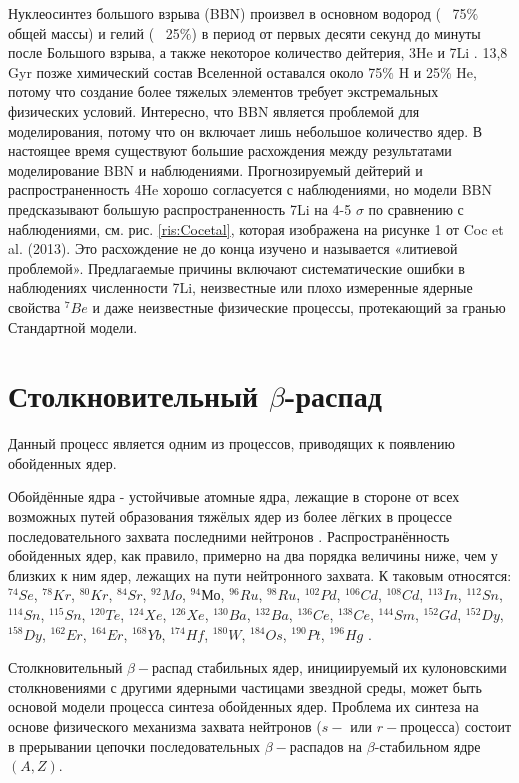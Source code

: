 \documentclass[%
master,    %
natbib,      %
subf,        %
href,        %
colorlinks,  %
]{disser}
\begin{document}
Нуклеосинтез большого взрыва (BBN) произвел в основном водород (~ 75$\%$ общей массы) и гелий (~ 25$\%$) в период от первых десяти секунд до минуты после Большого взрыва, а также некоторое количество дейтерия, 3He и 7Li \cite{Tytler}. 13,8 Gyr позже химический состав Вселенной оставался около 75$\%$ H и 25$\%$ He, потому что создание более тяжелых элементов требует экстремальных физических условий. Интересно, что BBN является проблемой для моделирования, потому что он включает лишь небольшое количество ядер. В настоящее время существуют большие расхождения между результатами моделирование BBN и наблюдениями. Прогнозируемый дейтерий и распространенность 4He хорошо согласуется с наблюдениями, но модели BBN предсказывают большую распространенность 7Li на 4-5 $\sigma$ по сравнению с наблюдениями, см. рис. \ref{ris:Cocetal}, которая изображена на рисунке 1 от Coc et al. (2013). Это расхождение не до конца изучено и называется «литиевой проблемой». Предлагаемые причины включают систематические ошибки в наблюдениях численности 7Li, неизвестные или плохо измеренные ядерные свойства $^{7}Be$ и даже неизвестные физические процессы, протекающий за гранью Стандартной модели.

\section{Столкновительный $\beta$-распад}
Данный процесс является одним из процессов, приводящих к появлению обойденных ядер.

Обойдённые ядра - устойчивые атомные ядра, лежащие в стороне от всех возможных путей образования тяжёлых ядер из более лёгких в процессе последовательного захвата последними нейтронов \cite{reactions}. Распространённость обойденных ядер, как правило, примерно на два порядка величины ниже, чем у близких к ним ядер, лежащих на пути нейтронного захвата. К таковым относятся: $^{74}Se$, $^{78}Kr$, $^{80}Kr$, $^{84}Sr$, $^{92}Mo$, $^{94}Мо$, $^{96}Ru$, $^{98}Ru$, $^{102}Pd$, $^{106}Cd$, $^{108}Cd$, $^{113}In$, $^{112}Sn$, $^{114}Sn$, $^{115}Sn$, $^{120}Te$, $^{124}Xe$, $^{126}Xe$, $^{130}Ba$, $^{132}Ba$, $^{136}Ce$, $^{138}Ce$, $^{144}Sm$, $^{152}Gd$, $^{152}Dy$, $^{158}Dy$, $^{162}Er$, $^{164}Er$, $^{168}Yb$, $^{174}Hf$, $^{180}W$, $^{184}Os$, $^{190}Pt$, $^{196}Hg$ \cite{role}.

Столкновительный $\beta-$распад стабильных ядер, инициируемый их кулоновскими столкновениями с другими ядерными частицами звездной среды, может быть основой модели процесса синтеза обойденных ядер.
Проблема их синтеза на основе физического механизма захвата нейтронов ($s-$ или $r-$процесса) состоит в прерывании цепочки последовательных $\beta-$распадов на $\beta$-стабильном ядре $(A,Z)$.
\end{document}
